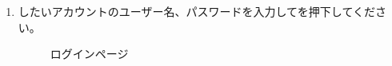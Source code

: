 \begin{enumerate}
                \newpage
                \item \nowplaying したい\mi アカウントのユーザー名、パスワードを入力してを押下してください。
                \label{item:misskey4}
                    \begin{figure}[htbp]
                        \centering
                        \caption{ログインページ}
                        \label{img:misskey3}
                    \end{figure}


\end{enumerate}
